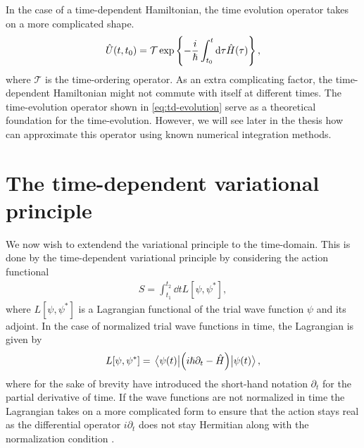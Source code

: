        In the case of a time-dependent Hamiltonian, the time evolution operator
        takes on a more complicated shape.
        \begin{align}
            \hat{U}(t, t_0) =
            \mathcal{T}\exp\left\{ 
                -\frac{i}{\hslash} \int_{t_0}^{t} \dd\tau
                \hat{H}(\tau)
             \right\},
            \label{eq:td-evolution}
        \end{align}
        where $\mathcal{T}$ is the time-ordering operator.
        As an extra complicating factor, the time-dependent Hamiltonian might
        not commute with itself at different times.
        The time-evolution operator shown in \autoref{eq:td-evolution} serve as
        a theoretical foundation for the time-evolution.
        However, we will see later in the thesis how can approximate this
        operator using known numerical integration methods.

    \section{The time-dependent variational principle}
        We now wish to extendend the variational principle to the time-domain.
        This is done by the time-dependent variational principle by considering
        the action functional
        \begin{align}
            S = \int_{t_1}^{t_2}\dd t L[\psi, \psi^{*}],
        \end{align}
        where $L[\psi, \psi^{*}]$ is a Lagrangian functional of the trial wave
        function $\psi$ and its adjoint.
        In the case of normalized trial wave functions in time, the Lagrangian
        is given by
        \begin{align}
            L[\psi, \psi^{*}]
            =
            \mel{\psi(t)}{
                \left( 
                    i\hslash\partial_t - \hat{H}\right)
            }{\psi(t)},
        \end{align}
        where for the sake of brevity have introduced the short-hand notation
        $\partial_t$ for the partial derivative of time.
        If the wave functions are not normalized in time the Lagrangian takes on
        a more complicated form to ensure that the action stays real as the
        differential operator $i\partial_t$ does not stay Hermitian along with
        the normalization condition \cite{kramer1981geometry}.

